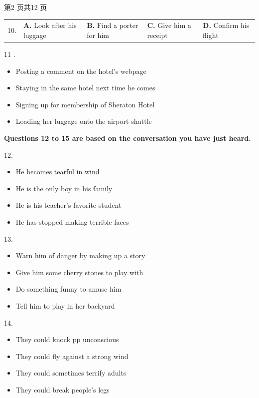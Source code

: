 \documentclass[UTF8,11pt]{ctexart}
\begin{document}
第2 页共12 页


\noindent\begin{tabularx}{\linewidth}{@{}lXXXX@{}}10. & \textbf{A.} Look after his luggage & \textbf{B.} Find a porter for him & \textbf{C.} Give him a receipt & \textbf{D.} Confirm his flight\\\end{tabularx}\par

11 .


\begin{itemize}[leftmargin=2em,itemsep=.2em,topsep=.4em]\item[A.] Posting a comment on the hotel’s webpage
\item[B.] Staying in the same hotel next time he comes
\item[C.] Signing up for membership of Sheraton Hotel
\item[D.] Loading her luggage onto the airport shuttle
\end{itemize}

\textbf{Questions 12 to 15 are based on the conversation you have just heard.}


12.


\begin{itemize}[leftmargin=2em,itemsep=.2em,topsep=.4em]\item[A.] He becomes tearful in wind
\item[B.] He is the only boy in his family
\item[C.] He is his teacher's favorite student
\item[D.] He has stopped making terrible faces
\end{itemize}

13.


\begin{itemize}[leftmargin=2em,itemsep=.2em,topsep=.4em]\item[A.] Warn him of danger by making up a story
\item[B.] Give him some cherry stones to play with
\item[C.] Do something funny to amuse him
\item[D.] Tell him to play in her backyard
\end{itemize}

14.


\begin{itemize}[leftmargin=2em,itemsep=.2em,topsep=.4em]\item[A.] They could knock pp unconscious
\item[B.] They could fly against a strong wind
\item[C.] They could sometimes terrify adults
\item[D.] They could break people's legs
\end{itemize}
\end{document}
